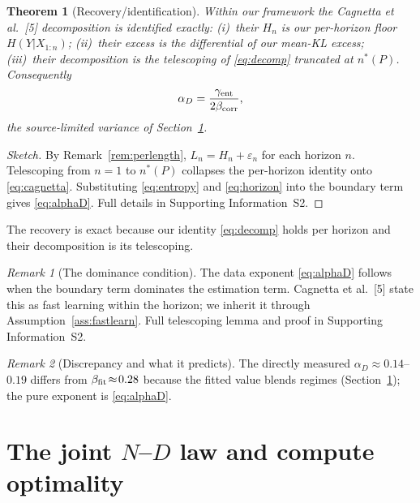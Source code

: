\documentclass[12pt]{article}
\newcommand{\eps}{\varepsilon}
\newtheorem{theorem}{Theorem}[section]
\theoremstyle{remark}
\newtheorem{remark}{Remark}
\begin{document}
\begin{theorem}[Recovery/identification]
\label{thm:recovery}
Within our framework the Cagnetta et al.\ [5] decomposition is identified exactly:
(i)~their $H_n$ is our per-horizon floor $H(Y|X_{1:n})$; (ii)~their excess is
the differential of our mean-KL excess; (iii)~their decomposition is the
telescoping of \eqref{eq:decomp} truncated at $n^*(P)$.  Consequently
\begin{equation}
  \alpha_D=\frac{\gamma_{\rm ent}}{2\beta_{\rm corr}},
  \label{eq:alphaD}
\end{equation}
the source-limited variance of Section~\ref{sec:joint}.
\end{theorem}

\begin{proof}[Sketch]
By Remark~\ref{rem:perlength}, $L_n=H_n+\eps_n$ for each horizon $n$.
Telescoping from $n=1$ to $n^*(P)$ collapses the per-horizon identity onto
\eqref{eq:cagnetta}.  Substituting \eqref{eq:entropy} and \eqref{eq:horizon}
into the boundary term gives \eqref{eq:alphaD}.  Full details in
Supporting Information~S2.
\end{proof}

The recovery is exact because our identity \eqref{eq:decomp} holds per
horizon and their decomposition is its telescoping.

\begin{remark}[The dominance condition]
\label{rem:dominance}
The data exponent \eqref{eq:alphaD} follows when the boundary term dominates
the estimation term.  Cagnetta et al.\ [5] state this as fast learning within the
horizon; we inherit it through Assumption~\ref{ass:fastlearn}.  Full
telescoping lemma and proof in Supporting Information~S2.
\end{remark}

\begin{remark}[Discrepancy and what it predicts]
\label{rem:discrepancy}
The directly measured $\alpha_D\!\approx\!0.14$--$0.19$ differs from
$\beta_{\rm fit}\!\approx\!0.28$ because the fitted value blends regimes
(Section~\ref{sec:joint}); the pure exponent is \eqref{eq:alphaD}.
\end{remark}

\section{The joint $N$--$D$ law and compute optimality}
\label{sec:joint}
\end{document}

